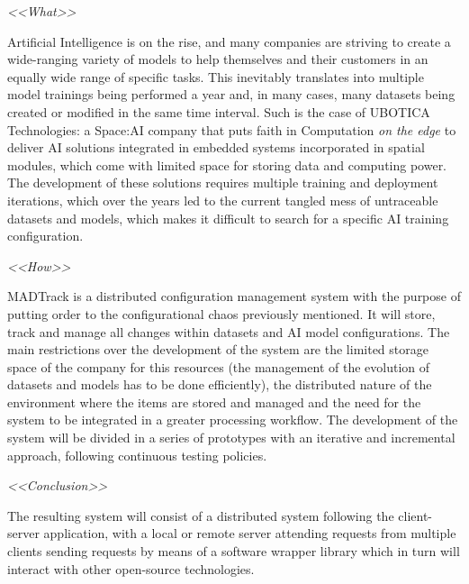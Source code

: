 \pagestyle{plain}	%



\begin{resumenAlt}[english]{\tituloCortoAlt} 

\emph{<<What>>}

Artificial Intelligence is on the rise, and many companies are striving to create a wide-ranging variety of models to help themselves and their customers in an equally wide range of specific tasks. This inevitably translates into multiple model trainings being performed a year and, in many cases, many datasets being created or modified in the same time interval. 
Such is the case of UBOTICA Technologies: a Space:AI company that puts faith in Computation \emph{on the edge} to deliver AI solutions integrated in embedded systems incorporated in spatial modules, which come with limited space for storing data and computing power. The development of these solutions requires multiple training and deployment iterations,
which over the years led to the current tangled mess of untraceable datasets and models, which makes it difficult to search for a specific AI training configuration. 


\emph{<<How>>}

MADTrack is a distributed configuration management system with the purpose of putting order to the configurational chaos previously mentioned. It will store, track and manage all changes within datasets and AI model configurations. The main 
restrictions over the development of the system are the limited storage space of the company for this resources (the management of the evolution of datasets and models has to be done efficiently), the distributed nature of the environment where the items 
are stored and managed and the need for the system to be integrated in a greater processing workflow. The development of the system will be divided in a series of prototypes with an iterative and incremental approach, following continuous testing policies.



\emph{<<Conclusion>>}

The resulting system will consist of a distributed system following the client-server application, with a local or remote server attending requests from multiple clients sending requests by means of a software wrapper library which in turn will interact with other open-source technologies.

\end{resumenAlt}

